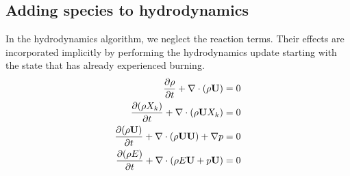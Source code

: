 \subsection{Adding species to hydrodynamics}

In the hydrodynamics algorithm, we neglect the reaction terms.  Their
effects are incorporated implicitly by performing the hydrodynamics
update starting with the state that has already experienced burning.
\begin{align}
{\frac{{\partial\rho}}{\partial t}} + \nabla \cdot (\rho {\bf U}) &= 0 \\
{\frac{{\partial(\rho X_k)}}{\partial t}} + \nabla \cdot (\rho {\bf U} X_k) &= 0 \\
{\frac{{\partial(\rho {\bf U})}}{\partial t}} + \nabla \cdot (\rho {\bf U} {\bf U}) + \nabla p &= 0 \\
{\frac{{\partial(\rho E)}}{\partial t}} + \nabla \cdot (\rho E {\bf U} + p {\bf U} ) &= 0
\end{align}



